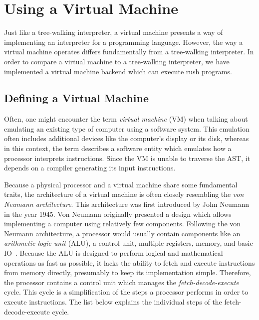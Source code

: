 \section{Using a Virtual Machine}

Just like a tree-walking interpreter, a virtual machine presents a way of implementing an interpreter for a programming language.
However, the way a virtual machine operates differs fundamentally from a tree-walking interpreter.
In order to compare a virtual machine to a tree-walking interpreter,
we have implemented a virtual machine backend which can execute rush programs.

\subsection{Defining a Virtual Machine}

Often, one might encounter the term \emph{virtual machine} (VM) when talking about emulating an existing type of computer using a software system.
This emulation often includes additional devices like the computer's display or its disk,
whereas in this context, the term describes a software entity which emulates how a processor interprets instructions.
Since the VM is unable to traverse the AST, it depends on a compiler generating its input instructions.

Because a physical processor and a virtual machine share some fundamental traits,
the architecture of a virtual machine is often closely resembling the \emph{von Neumann architecture}.
This architecture was first introduced by John Neumann in the year 1945.
Von Neumann originally presented a design which allows implementing a computer using relatively few components.
Following the von Neumann architecture, a processor would usually contain components like an \emph{arithmetic logic unit} (ALU), a control unit, multiple registers, memory, and basic IO~\cite[p.~172]{Ledin2020-yp}.
Because the ALU is designed to perform logical and mathematical operations as fast as possible,
it lacks the ability to fetch and execute instructions from memory directly, presumably to keep its implementation simple.
Therefore, the processor contains a control unit which manages the \emph{fetch-decode-execute} cycle.
This cycle is a simplification of the steps a processor performs in order to execute instructions.
The list below explains the individual steps of the fetch-decode-execute cycle.

